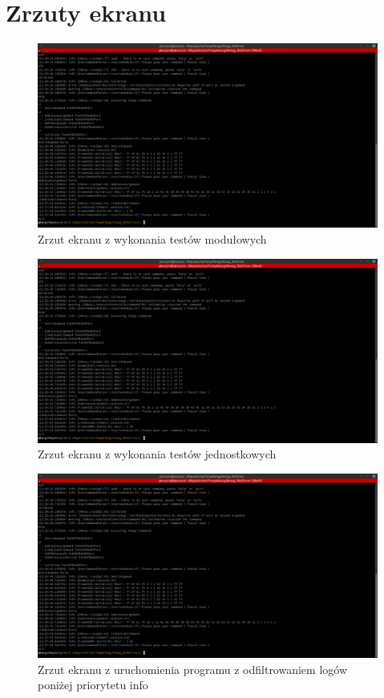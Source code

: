 \section{Zrzuty ekranu}
	\begin{figure}[p]
	\includegraphics[scale=0.3]{ExecutionOnSeverityInfo.png}
	\caption{Zrzut ekranu z wykonania testów modułowych}
	\end{figure}
	
	\begin{figure}[p]
	\includegraphics[scale=0.3]{ExecutionOnSeverityInfo.png}
	\caption{Zrzut ekranu z wykonania testów jednostkowych}
	\end{figure}
	
	\begin{figure}[p]
	\includegraphics[scale=0.3]{ExecutionOnSeverityInfo.png}
	\caption{Zrzut ekranu z uruchomienia programu z odfiltrowaniem logów poniżej priorytetu info}
	\end{figure}
	
